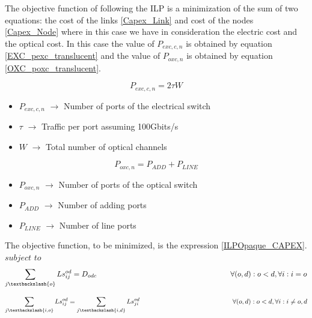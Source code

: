 The objective function of following the ILP is a minimization of the sum of two equations: the cost of the links \ref{Capex_Link} and cost of the nodes \ref{Capex_Node} where in this case we have in consideration the electric cost and the optical cost.
In this case the value of $P_{exc,c,n}$ is obtained by equation \ref{EXC_pexc_translucent} and the value of $P_{oxc,n}$ is obtained by equation \ref{OXC_poxc_translucent}.

\begin{equation}
P_{exc,c,n} = 2 \tau W
\label{EXC_pexc_translucent}
\end{equation}

\begin{itemize}
\item{$P_{exc,c,n}$	    $\rightarrow$	Number of ports of the electrical switch}
\item{$\tau$			$\rightarrow$	Traffic per port assuming 100Gbits/s}
\item{$W$				$\rightarrow$	Total number of optical channels}
\end{itemize}

\begin{equation}
P_{oxc,n} = P_{ADD} + P_{LINE}
\label{OXC_poxc_translucent}
\end{equation}
\begin{itemize}
\item{$P_{oxc,n}$	    $\rightarrow$	Number of ports of the optical switch}
\item{$P_{ADD}$			$\rightarrow$	Number of adding ports}
\item{$P_{LINE}$		$\rightarrow$	Number of line ports}
\end{itemize}

\vspace{17pt}
The objective function, to be minimized, is the expression \ref{ILPOpaque_CAPEX}.\\

$subject$ $to$
\begin{equation}
\sum_{j\textbackslash \{o\}} Ls_{ij}^{od} = D_{odc}  \qquad \qquad \qquad \qquad \qquad \qquad \qquad \qquad \qquad
\forall(o,d) : o < d, \forall i: i = o
\label{ILPTransluc1}
\end{equation}

\begin{equation}
\sum_{j\textbackslash \{i,o\}} Ls_{ij}^{od} = \sum_{j\textbackslash \{i,d\}} Ls_{ji}^{od} \qquad \qquad \qquad \qquad \qquad \qquad \qquad
\forall(o,d) : o < d, \forall i: i \neq o,d
\label{ILPTransluc2}
\end{equation}

